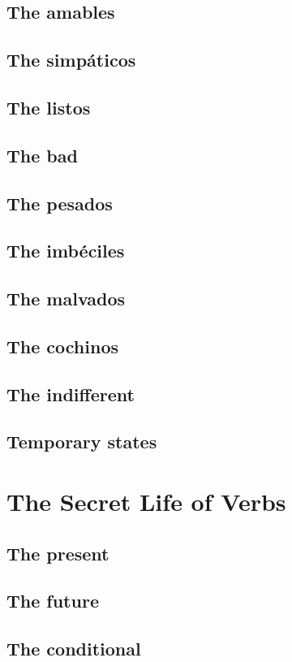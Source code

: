 \section{The amables}
\section{The simpáticos}
\section{The listos}
\section{The bad}
\section{The pesados}
\section{The imbéciles}
\section{The malvados}
\section{The cochinos}
\section{The indifferent}
\section{Temporary states}

\chapter{The Secret Life of Verbs}

\section{The present}
\section{The future}
\section{The conditional}
